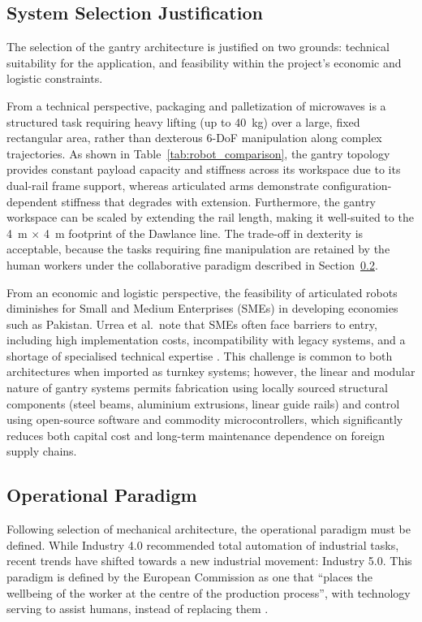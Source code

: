 \subsection{System Selection Justification}

The selection of the gantry architecture is justified on two grounds: technical suitability for the application, and feasibility within the project's economic and logistic constraints.

From a technical perspective, packaging and palletization of microwaves is a structured task requiring heavy lifting (up to \qty{40}{kg}) over a large, fixed rectangular area, rather than dexterous 6-DoF manipulation along complex trajectories. As shown in Table~\ref{tab:robot_comparison}, the gantry topology provides constant payload capacity and stiffness across its workspace due to its dual-rail frame support, whereas articulated arms demonstrate configuration-dependent stiffness that degrades with extension. Furthermore, the gantry workspace can be scaled by extending the rail length, making it well-suited to the \qty{4}{m} $\times$ \qty{4}{m} footprint of the Dawlance line. The trade-off in dexterity is acceptable, because the tasks requiring fine manipulation are retained by the human workers under the collaborative paradigm described in Section~\ref{sec:operational_paradigm}.

From an economic and logistic perspective, the feasibility of articulated robots diminishes for Small and Medium Enterprises (SMEs) in developing economies such as Pakistan. Urrea et al.\ note that SMEs often face barriers to entry, including high implementation costs, incompatibility with legacy systems, and a shortage of specialised technical expertise \cite{urrea2024advances}. This challenge is common to both architectures when imported as turnkey systems; however, the linear and modular nature of gantry systems permits fabrication using locally sourced structural components (steel beams, aluminium extrusions, linear guide rails) and control using open-source software and commodity microcontrollers, which significantly reduces both capital cost and long-term maintenance dependence on foreign supply chains.

\subsection{Operational Paradigm}
\label{sec:operational_paradigm}

Following selection of mechanical architecture, the operational paradigm must be defined. While Industry 4.0 recommended total automation of industrial tasks, recent trends have shifted towards a new industrial movement: Industry 5.0. This paradigm is defined by the European Commission as one that ``places the wellbeing of the worker at the centre of the production process'', with technology serving to assist humans, instead of replacing them \cite{breque2021industry5}.

